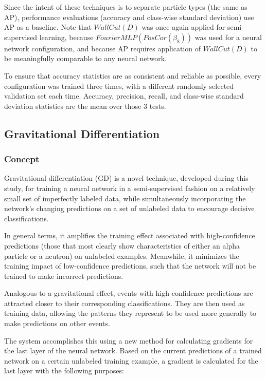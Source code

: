 \documentclass[10pt]{article}
\begin{document}
Since the intent of these techniques is to separate particle types (the same as AP), performance evaluations (accuracy and class-wise standard deviation) use AP as a baseline. Note that $WallCut(D)$ was once again applied for semi-supervised learning, because $FourierMLP(PosCor(\beta_{8}))$ was used for a neural network configuration, and because AP requires application of $WallCut(D)$ to be meaningfully comparable to any neural network.

To ensure that accuracy statistics are as consistent and reliable as possible, every configuration was trained three times, with a different randomly selected validation set each time. Accuracy, precision, recall, and class-wise standard deviation statistics are the mean over those 3 tests.

\subsection{Gravitational Differentiation}

\subsubsection{Concept}

Gravitational differentiation (GD) is a novel technique, developed during this study, for training a neural network in a semi-supervised fashion on a relatively small set of imperfectly labeled data, while simultaneously incorporating the network's changing predictions on a set of unlabeled data to encourage decisive classifications.

In general terms, it amplifies the training effect associated with high-confidence predictions (those that most clearly show characteristics of either an alpha particle or a neutron) on unlabeled examples. Meanwhile, it minimizes the training impact of low-confidence predictions, such that the network will not be trained to make incorrect predictions.

Analogous to a gravitational effect, events with high-confidence predictions are attracted closer to their corresponding classifications. They are then used as training data, allowing the patterns they represent to be used more generally to make predictions on other events.

The system accomplishes this using a new method for calculating gradients for the last layer of the neural network. Based on the current predictions of a trained network on a certain unlabeled training example, a gradient is calculated for the last layer with the following purposes:
\end{document}
